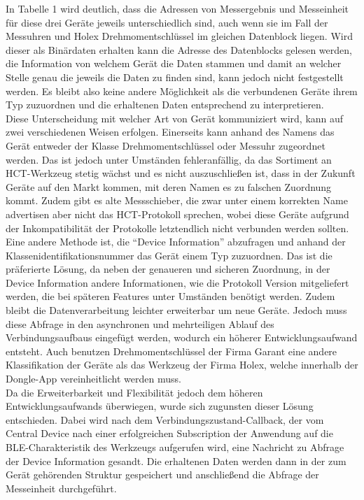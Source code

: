 In Tabelle 1 wird deutlich, dass die Adressen von Messergebnis und Messeinheit für diese drei Geräte jeweils unterschiedlich sind, auch wenn sie im Fall der Messuhren und Holex Drehmomentschlüssel im gleichen Datenblock liegen. Wird dieser als Binärdaten erhalten kann die Adresse des Datenblocks gelesen werden, die Information von welchem Gerät die Daten stammen und damit an welcher Stelle genau die jeweils die Daten zu finden sind, kann jedoch nicht festgestellt werden. Es bleibt also keine andere Möglichkeit als die verbundenen Geräte ihrem Typ zuzuordnen und die erhaltenen Daten entsprechend zu interpretieren.\\ 
Diese Unterscheidung mit welcher Art von Gerät kommuniziert wird, kann auf zwei verschiedenen Weisen erfolgen. Einerseits kann anhand des Namens das Gerät entweder der Klasse Drehmomentschlüssel oder Messuhr zugeordnet werden. Das ist jedoch unter Umständen fehleranfällig, da das Sortiment an \ac{HCT}-Werkzeug stetig wächst und es nicht auszuschließen ist, dass in der Zukunft Geräte auf den Markt kommen, mit deren Namen es zu falschen Zuordnung kommt. Zudem gibt es alte Messschieber, die zwar unter einem korrekten Name advertisen aber nicht das \ac{HCT}-Protokoll sprechen, wobei diese Geräte aufgrund der Inkompatibilität der Protokolle letztendlich nicht verbunden werden sollten.\\
Eine andere Methode ist, die ``Device Information'' abzufragen und anhand der Klassenidentifikationsnummer das Gerät einem Typ zuzuordnen. Das ist die präferierte Lösung, da neben der genaueren und sicheren Zuordnung, in der Device Information andere Informationen, wie die Protokoll Version mitgeliefert werden, die bei späteren Features unter Umständen benötigt werden. Zudem bleibt die Datenverarbeitung leichter erweiterbar um neue Geräte. Jedoch muss diese Abfrage in den asynchronen und mehrteiligen Ablauf des Verbindungsaufbaus eingefügt werden, wodurch ein höherer Entwicklungsaufwand entsteht. Auch benutzen Drehmomentschlüssel der Firma Garant eine andere Klassifikation der Geräte als das Werkzeug der Firma Holex, welche innerhalb der Dongle-App vereinheitlicht werden muss.\\
Da die Erweiterbarkeit und Flexibilität jedoch dem höheren Entwicklungsaufwands überwiegen, wurde sich zugunsten dieser Lösung entschieden. Dabei wird nach dem Verbindungszustand-Callback, der vom Central Device nach einer erfolgreichen Subscription der Anwendung auf die \ac{BLE}-Charakteristik des Werkzeugs aufgerufen wird, eine Nachricht zu Abfrage der Device Information gesandt. Die erhaltenen Daten werden dann in der zum Gerät gehörenden Struktur gespeichert und anschließend die Abfrage der Messeinheit durchgeführt. 

